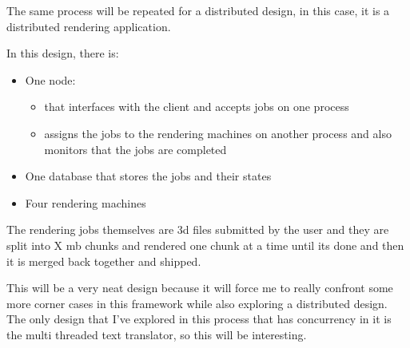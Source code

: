 The same process will be repeated for a distributed design, in this case, it is a distributed rendering application. 

In this design, there is:

\begin{itemize}
    \item One node:
        \begin{itemize}
            \item that interfaces with the client and accepts jobs on one process
            \item assigns the jobs to the rendering machines on another process and also monitors that the jobs are completed
        \end{itemize}
    \item One database that stores the jobs and their states
    \item Four rendering machines
\end{itemize}

The rendering jobs themselves are 3d files submitted by the user and they are split into X mb chunks and rendered one chunk at a time until its done and then it is merged back together and shipped.

This will be a very neat design because it will force me to really confront some more corner cases in this framework while also exploring a distributed design. The only design that I've explored in this process that has concurrency in it is the multi threaded text translator, so this will be interesting.